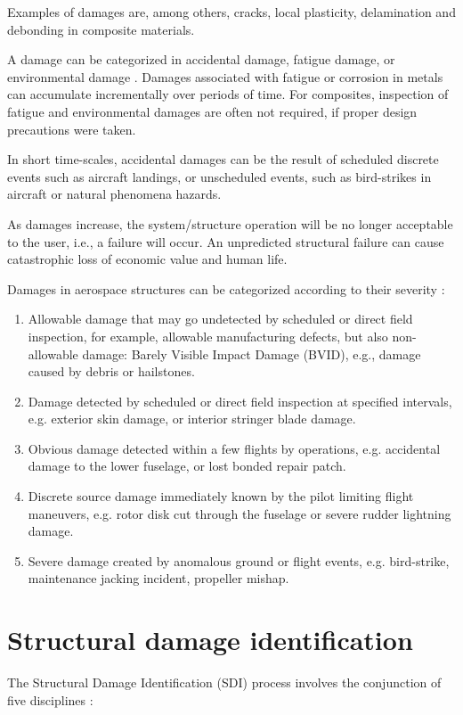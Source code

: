 Examples of damages are, among others, cracks, local plasticity, delamination and debonding in composite materials.

A damage can be categorized in accidental damage, fatigue damage, or environmental damage \cite{baaran2009, venterink2017frequency}. Damages associated with fatigue or corrosion in metals can accumulate incrementally over periods of time. For composites, inspection of fatigue and environmental damages are often not required, if proper design precautions were taken.

In short time-scales, accidental damages can be the result of scheduled discrete events such as aircraft landings, or unscheduled events, such as bird-strikes in aircraft or natural phenomena hazards.

As damages increase, the system/structure operation will be no longer acceptable to the user, i.e., a failure will occur. An unpredicted structural failure can cause catastrophic loss of economic value and human life.

Damages in aerospace structures can be categorized according to their severity :

\begin{enumerate}
    \item Allowable damage that may go undetected by scheduled or direct field inspection, for example, allowable manufacturing defects, but also non-allowable damage: Barely Visible Impact Damage (BVID), e.g., damage caused by debris or hailstones.
    \item Damage detected by scheduled or direct field inspection at specified intervals, e.g. exterior skin damage, or interior stringer blade damage.
    \item Obvious damage detected within a few flights by operations, e.g. accidental damage to the lower fuselage, or lost bonded repair patch.
    \item Discrete source damage immediately known by the pilot limiting flight maneuvers, e.g. rotor disk cut through the fuselage or severe rudder lightning damage.
    \item Severe damage created by anomalous ground or flight events, e.g. bird-strike, maintenance jacking incident, propeller mishap.
\end{enumerate}

\section{Structural damage identification}
The Structural Damage Identification (SDI) process involves the conjunction of five disciplines \cite{farrar2010introduction, Farrar2007c}:

